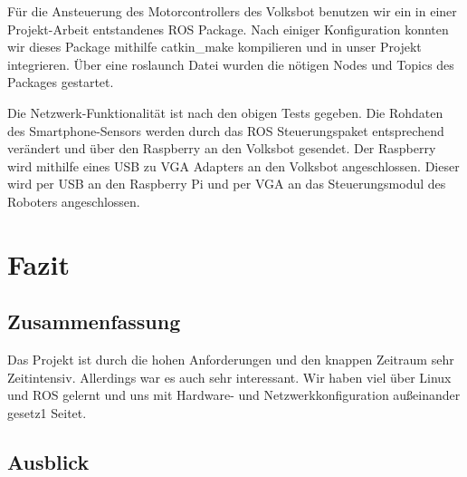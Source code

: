 \documentclass[12pt]{article}
\begin{document}
Für die Ansteuerung des Motorcontrollers des Volksbot benutzen wir ein in einer Projekt-Arbeit entstandenes ROS Package.
Nach einiger Konfiguration konnten wir dieses Package mithilfe catkin_make kompilieren und in unser Projekt integrieren.
Über eine roslaunch Datei wurden die nötigen Nodes und Topics des Packages gestartet.

Die Netzwerk-Funktionalität ist nach den obigen Tests gegeben.
Die Rohdaten des Smartphone-Sensors werden durch das ROS Steuerungspaket entsprechend verändert und über den Raspberry an den Volksbot gesendet.
Der Raspberry wird mithilfe eines USB zu VGA Adapters an den Volksbot angeschlossen. Dieser wird per USB an den Raspberry Pi und per VGA an das Steuerungsmodul des Roboters angeschlossen.















\section{Fazit}
\subsection{Zusammenfassung}

Das Projekt ist durch die hohen Anforderungen und den knappen Zeitraum sehr Zeitintensiv. Allerdings war es auch sehr interessant. Wir haben viel über Linux und ROS gelernt und uns mit Hardware- und Netzwerkkonfiguration außeinander gesetz1 Seitet.


\subsection{Ausblick}
\end{document}
